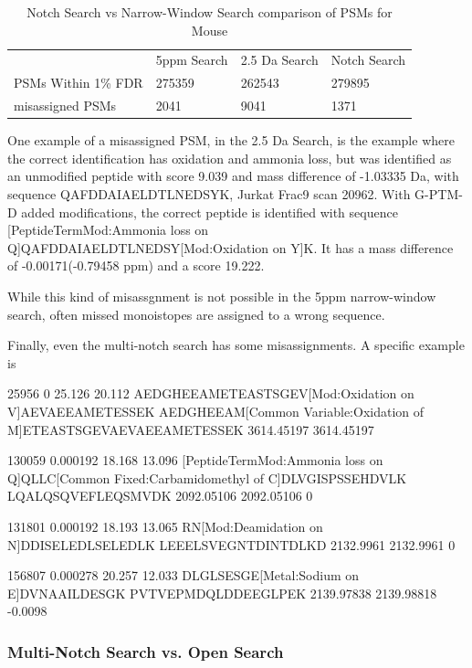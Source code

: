 \documentclass[journal=jprobs,manuscript=article]{achemso}
\begin{document}
\begin{table}[]
\centering
\caption{Notch Search vs Narrow-Window Search comparison of PSMs for Mouse}
\label{tbl:singleVsMultiNotch}
\begin{tabular}{llll}
                    & 5ppm Search & 2.5 Da Search & Notch Search \\
PSMs Within 1\% FDR & 275359      & 262543        & 279895       \\
misassigned PSMs    & 2041           & 9041          & 1371            \\
\end{tabular}
\end{table}

One example of a misassigned PSM, in the 2.5 Da Search, is the example where the correct identification has oxidation and ammonia loss, but was identified as an unmodified peptide with score 9.039 and mass difference of -1.03335 Da, with sequence QAFDDAIAELDTLNEDSYK, Jurkat Frac9 scan 20962.
With G-PTM-D added modifications, the correct peptide is identified with sequence [PeptideTermMod:Ammonia loss on Q]QAFDDAIAELDTLNEDSY[Mod:Oxidation on Y]K. It has a mass difference of -0.00171(-0.79458 ppm) and a score 19.222.

While this kind of misassgnment is not possible in the 5ppm narrow-window search, often missed monoistopes are assigned to a wrong sequence.

Finally, even the multi-notch search has some misassignments.
A specific example is 

25956	0	25.126	20.112	AEDGHEEAMETEASTSGEV[Mod:Oxidation on V]AEVAEEAMETESSEK	AEDGHEEAM[Common Variable:Oxidation of M]ETEASTSGEVAEVAEEAMETESSEK	3614.45197	3614.45197

130059	0.000192	18.168	13.096	[PeptideTermMod:Ammonia loss on Q]QLLC[Common Fixed:Carbamidomethyl of C]DLVGISPSSEHDVLK	LQALQSQVEFLEQSMVDK	2092.05106	2092.05106	0

131801	0.000192	18.193	13.065	RN[Mod:Deamidation on N]DDISELEDLSELEDLK	LEEELSVEGNTDINTDLKD	2132.9961	2132.9961	0


156807	0.000278	20.257	12.033	DLGLSESGE[Metal:Sodium on E]DVNAAILDESGK	PVTVEPMDQLDDEEGLPEK	2139.97838	2139.98818	-0.0098

\newpage

\subsubsection{Multi-Notch Search vs. Open Search}
\end{document}

